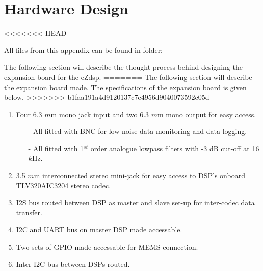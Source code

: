 \section{Hardware Design}
<<<<<<< HEAD

All files from this appendix can be found in folder: \\

The following section will describe the thought process behind designing the expansion board for the eZdsp. 
=======
The following section will describe the expansion board made. The specifications of the expansion board is given below.%
>>>>>>> b1faa191a4d9120137c7e4956d9040073592c05d




\begin{enumerate}
	\item Four 6.3 $m$m mono jack input and two 6.3 $m$m mono output for easy access.
	\begin{itemize}
		\item[-] All fitted with BNC for low noise data monitoring and data logging.
		\item[-] All fitted with 1$^{st}$ order analogue lowpass filters with -3 dB cut-off at 16 $k$Hz.
	\end{itemize}
	\item 3.5 $m$m interconnected stereo mini-jack for easy access to DSP's onboard TLV320AIC3204 stereo codec.
	\item I2S bus routed between DSP as master and slave set-up for inter-codec data transfer.
	\item I2C and UART bus on master DSP made accessable.
	\item Two sets of GPIO made accessable for MEMS connection.
	\item Inter-I2C bus between DSPs routed. 
\end{enumerate}


